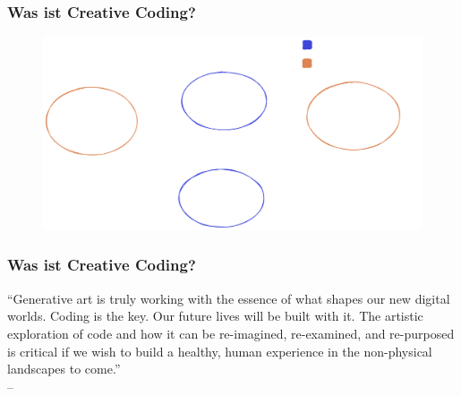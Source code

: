 \documentclass[aspectratio=169]{beamer}
\begin{document}
\begin{frame}
	\frametitle{Was ist Creative Coding?}
    \begin{figure}
    \includegraphics[width=\textwidth]{./figs/cycle2.png}
    \end{figure}
\end{frame}


\begin{frame}
	\frametitle{Was ist Creative Coding?}
	\begin{center}
	\enquote{Generative art is truly working with the essence of what shapes our new digital worlds. Coding is the key. Our future lives will be built with it. The artistic exploration of code and how it can be re-imagined, re-examined, and re-purposed is critical if we wish to build a healthy, human experience in the non-physical landscapes to come.}\\-- \cite{hobbs:2021}
	\end{center}
\end{frame}
\end{document}
